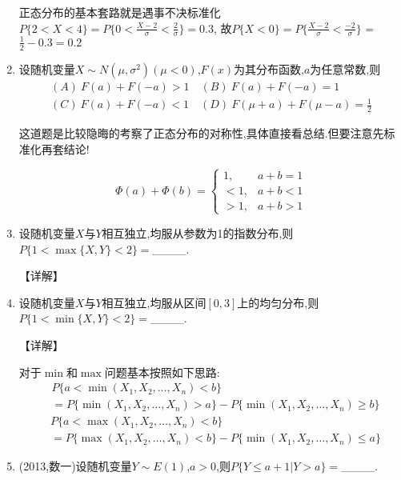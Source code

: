\documentclass[12pt, a4paper, oneside, UTF8]{ctexbook}
\begin{document}
\begin{enumerate}[label=\arabic*.,start=6]
    \begin{solution}
    正态分布的基本套路就是遇事不决标准化
    $P\{2<X<4\}=P\{0<\frac{X-2}{\sigma}<\frac{2}{\sigma}\}=0.3$,
    故$P\{X<0\}=P\{\frac{X-2}{\sigma}<\frac{-2}{\sigma}\}$ = $\frac{1}{2}-0.3=0.2$
    \end{solution}
    
    \item  设随机变量$X\sim N(\mu,\sigma^2)(\mu<0)$,$F(x)$为其分布函数,$a$为任意常数,则
    \begin{align*}
        (A)\ F(a)+F(-a)>1 \quad (B)\ F(a)+F(-a)=1 \\
        (C)\ F(a)+F(-a)<1 \quad (D)\ F(\mu+a)+F(\mu-a)=\frac{1}{2}
    \end{align*}
    
    \begin{solution}
    这道题是比较隐晦的考察了正态分布的对称性,具体直接看总结.但要注意先标准化再套结论!
    \end{solution}
    \begin{tcolorbox}
        \[
        \Phi(a)+\Phi(b) = \begin{cases}
            1, & a+b=1 \\
            < 1, & a+b < 1\\
            > 1, & a+b > 1 
        \end{cases} 
        \]
    \end{tcolorbox}
    \item  设随机变量$X$与$Y$相互独立,均服从参数为1的指数分布,则$P\{1<\max\{X,Y\}<2\}=$\_\_\_\_.
    
    \begin{solution}
    【详解】
    \end{solution}
    
    \item  设随机变量$X$与$Y$相互独立,均服从区间$[0,3]$上的均匀分布,则$P\{1<\min\{X,Y\}<2\}=$\_\_\_\_.
    
    \begin{solution}
    【详解】
    \end{solution}
    
    \begin{tcolorbox}[title=总结]
        对于$\min\text{和}\max$问题基本按照如下思路:
        \begin{align*}
            &P\{a<\min{(X_1,X_2,\ldots,X_n)}<b\}  \\
            &= P\{\min{(X_1,X_2,\ldots,X_n)}>a\}-P\{\min{(X_1,X_2,\ldots,X_n)}\geq b\}
        \end{align*}
        \begin{align*}
        &P\{a<\max{(X_1,X_2,\ldots,X_n)}<b\} \\
        &=P\{\max{(X_1,X_2,\ldots,X_n)}<b\}-P\{\min{(X_1,X_2,\ldots,X_n)}\leq a\}
        \end{align*}
    \end{tcolorbox}
    \item  (2013,数一)设随机变量$Y\sim E(1)$,$a>0$,则$P\{Y\leq a+1|Y>a\}=$\_\_\_\_.
    

\end{enumerate}
\end{document}

